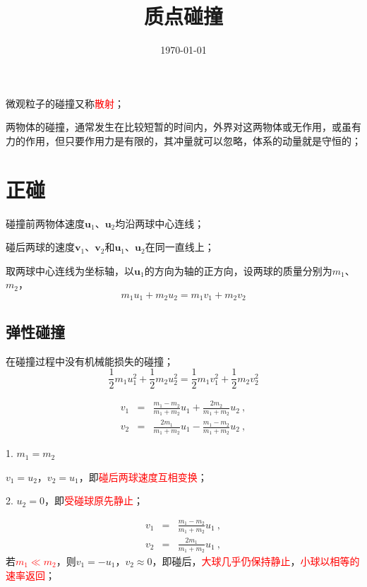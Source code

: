 \documentclass[12pt,a4paper]{article}
\title{质点碰撞}
\author{}
\date{\today}
\renewcommand{\vec}[1]{\boldsymbol{#1}}
\begin{document}
\maketitle

微观粒子的碰撞又称\textcolor{red}{散射}；

两物体的碰撞，通常发生在比较短暂的时间内，外界对这两物体或无作用，或虽有力的作用，但只要作用力是有限的，其冲量就可以忽略，体系的动量就是守恒的；
\section{正碰}
碰撞前两物体速度$\vec{u}_1$、$\vec{u}_2$均沿两球中心连线；

碰后两球的速度$\vec{v}_1$、$\vec{v}_2$和$\vec{u}_1$、$\vec{u}_2$在同一直线上；

取两球中心连线为坐标轴，以$\vec{u}_1$的方向为轴的正方向，设两球的质量分别为$m_1$、$m_2$，
\begin{equation}
m_1 u_1 + m_2 u_2 = m_1 v_1 + m_2 v_2
\end{equation}

\subsection{弹性碰撞}
在碰撞过程中没有机械能损失的碰撞；
\begin{equation}
\frac{1}{2} m_1 u_1^2 +\frac{1}{2} m_2 u_2^2 = \frac{1}{2} m_1 v_1^2 +\frac{1}{2} m_2 v_2^2
\end{equation}

\begin{eqnarray}
\nonumber v_1 &=& \frac{m_1 -m_2}{m_1 +m_2} u_1 +\frac{2m_2}{m_1 +m_2} u_2 ~,\\
v_2 &=& \frac{2m_1}{m_1 +m_2} u_1 -\frac{m_1 -m_2}{m_1 +m_2} u_2 ~,
\end{eqnarray}

1. $m_1 = m_2$

$v_1 = u_2$，$v_2 = u_1$，即\textcolor{red}{碰后两球速度互相变换}；

2. $u_2 = 0$，即\textcolor{red}{受碰球原先静止}；

\begin{eqnarray}
\nonumber v_1 &=& \frac{m_1 -m_2}{m_1 +m_2} u_1 ~, \\
v_2 &=& \frac{2m_1}{m_1 +m_2} u_1 ~,
\end{eqnarray}
若\textcolor{red}{$m_1 \ll m_2$}，则$v_1 = -u_1$，$v_2 \approx 0$，即碰后，\textcolor{red}{大球几乎仍保持静止}，\textcolor{red}{小球以相等的速率返回}；
\end{document}
